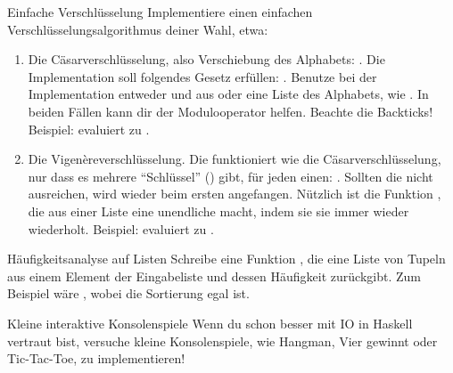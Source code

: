 \documentclass{uebblatt}
\begin{document}
\begin{aufgabe}{Einfache Verschlüsselung}
	Implementiere einen einfachen Verschlüsselungsalgorithmus deiner Wahl, etwa:
	\begin{enumerate}
		\item Die Cäsarverschlüsselung, also Verschiebung des Alphabets: . Die Implementation soll folgendes Gesetz erfüllen: .
            Benutze bei der Implementation entweder  und  aus  oder eine Liste des Alphabets, wie \haskellinline{['A'..'Z'] ++ ['a'..'z'] :: [Char]}. In beiden Fällen kann dir der Modulooperator  helfen. Beachte die Backticks! Beispiel:  evaluiert zu .
        \item Die Vigenèreverschlüsselung. Die funktioniert wie die Cäsarverschlüsselung, nur dass es mehrere "`Schlüssel"' () gibt, für jeden  einen: . Sollten die  nicht ausreichen, wird wieder beim ersten angefangen. Nützlich ist die Funktion , die aus einer Liste eine unendliche macht, indem sie sie immer wieder wiederholt. Beispiel:  evaluiert zu .
	\end{enumerate}
\end{aufgabe}

\begin{aufgabe}{Häufigkeitsanalyse auf Listen}
	Schreibe eine Funktion , die eine Liste von Tupeln aus einem Element der Eingabeliste und dessen Häufigkeit zurückgibt. Zum Beispiel wäre , wobei die Sortierung egal ist.
\end{aufgabe}

\begin{aufgabe}{Kleine interaktive Konsolenspiele}
Wenn du schon besser mit IO in Haskell vertraut bist, versuche kleine Konsolenspiele, wie Hangman, Vier gewinnt oder Tic-Tac-Toe, zu implementieren!
\end{aufgabe}
\end{document}
